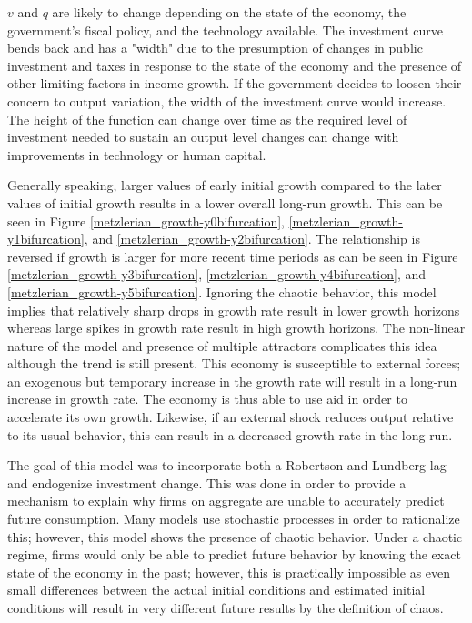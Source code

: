 $v$ and $q$ are likely to change depending on the state of the economy, the government's fiscal policy, and the technology available. The investment curve bends back and has a "width" due to the presumption of changes in public investment and taxes in response to the state of the economy and the presence of other limiting factors in income growth. If the government decides to loosen their concern to output variation, the width of the investment curve would increase. The height of the function can change over time as the required level of investment needed to sustain an output level changes can change with improvements in technology or human capital. 

Generally speaking, larger values of early initial growth compared to the later values of initial growth results in a lower overall long-run growth. This can be seen in Figure \ref{metzlerian_growth-y0bifurcation}, \ref{metzlerian_growth-y1bifurcation}, and \ref{metzlerian_growth-y2bifurcation}. The relationship is reversed if growth is larger for more recent time periods as can be seen in Figure \ref{metzlerian_growth-y3bifurcation}, \ref{metzlerian_growth-y4bifurcation}, and \ref{metzlerian_growth-y5bifurcation}. Ignoring the chaotic behavior, this model implies that relatively sharp drops in growth rate result in lower growth horizons whereas large spikes in growth rate result in high growth horizons. The non-linear nature of the model and presence of multiple attractors complicates this idea although the trend is still present. This economy is susceptible to external forces; an exogenous but temporary increase in the growth rate will result in a long-run increase in growth rate. The economy is thus able to use aid in order to accelerate its own growth. Likewise, if an external shock reduces output relative to its usual behavior, this can result in a decreased growth rate in the long-run. 

The goal of this model was to incorporate both a Robertson and Lundberg lag and endogenize investment change. This was done in order to provide a mechanism to explain why firms on aggregate are unable to accurately predict future consumption. Many models use stochastic processes in order to rationalize this; however, this model shows the presence of chaotic behavior. Under a chaotic regime, firms would only be able to predict future behavior by knowing the exact state of the economy in the past; however, this is practically impossible as even small differences between the actual initial conditions and estimated initial conditions will result in very different future results by the definition of chaos. 

